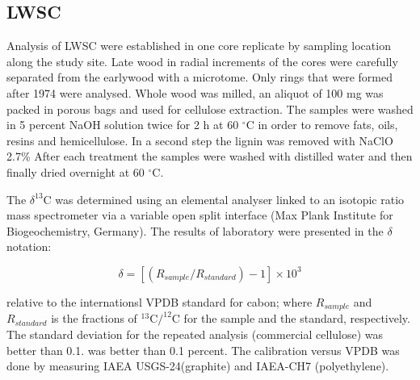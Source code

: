 \documentclass[review,authoryear]{elsarticle}
\begin{document}
\subsection{\acrlong{LWSC}}
Analysis of \gls{LWSC} were established in one core replicate by
sampling location along the study site. Late wood in radial increments
of the cores were carefully separated from the earlywood with a
microtome. Only rings that were formed after 1974 were analysed. Whole
wood was milled, an aliquot of 100 mg was packed in porous bags and
used for cellulose extraction. The samples were washed in 5 percent
NaOH solution twice for 2 h at 60 $^{\circ}$C in order to remove fats,
oils, resins and hemicellulose. In a second step the lignin was
removed with NaClO 2.7\% After each treatment the samples were washed
with distilled water and then finally dried overnight at 60
$^{\circ}$C.

The $\delta^{13}$C was determined using an elemental analyser linked
to an isotopic ratio mass spectrometer via a variable open split
interface (Max Plank Institute for Biogeochemistry, Germany). The
results of laboratory were presented in the $\delta$ notation:

\begin{equation}\label{eq:dC}
\delta = \left [ \left ( R_{sample}/R_{standard} \right )-1 \right ]\times 10^3 
\end{equation}

relative to the internationsl VPDB standard for cabon; where
$R_{sample}$ and $R_{standard}$ is the fractions of $^{13}$C$/^{12}$C
for the sample and the standard, respectively. The standard deviation
for the repeated analysis (commercial cellulose) was better than
0.1. was better than 0.1 percent. The calibration versus VPDB was done
by measuring IAEA USGS-24(graphite) and IAEA-CH7 (polyethylene).

\end{document}
